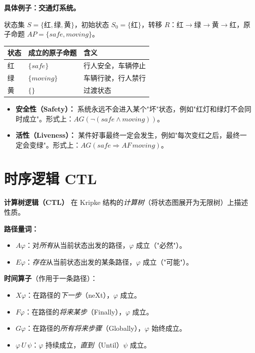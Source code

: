 \documentclass[UTF8,openany,12pt]{ctexbook}
\theoremstyle{remark}
\begin{document}
\textbf{具体例子：交通灯系统。}

状态集 $S = \{\text{红}, \text{绿}, \text{黄}\}$，初始状态 $S_0 = \{\text{红}\}$，转移 $R$：红$\to$绿$\to$黄$\to$红，原子命题 $AP = \{\mathit{safe}, \mathit{moving}\}$。

\begin{center}
\begin{tabular}{@{}lll@{}}
\toprule
状态 & 成立的原子命题 & 含义 \\
\midrule
红 & $\{\mathit{safe}\}$       & 行人安全，车辆停止 \\
绿 & $\{\mathit{moving}\}$     & 车辆行驶，行人禁行 \\
黄 & $\{\}$                    & 过渡状态 \\
\bottomrule
\end{tabular}
\end{center}

\begin{itemize}
  \item \textbf{安全性（Safety）：} 系统永远不会进入某个"坏"状态，例如"红灯和绿灯不会同时成立"。形式上：$AG(\neg(\mathit{safe} \wedge \mathit{moving}))$。
  \item \textbf{活性（Liveness）：} 某件好事最终一定会发生，例如"每次变红之后，最终一定会变绿"。形式上：$AG(\mathit{safe} \Rightarrow AF\, \mathit{moving})$。
\end{itemize}

\section{时序逻辑 CTL}

\textbf{计算树逻辑（CTL）} 在 Kripke 结构的\emph{计算树}（将状态图展开为无限树）上描述性质。

\textbf{路径量词：}
\begin{itemize}
  \item $A\varphi$：对\emph{所有}从当前状态出发的路径，$\varphi$ 成立（"必然"）。
  \item $E\varphi$：\emph{存在}从当前状态出发的某条路径，$\varphi$ 成立（"可能"）。
\end{itemize}

\textbf{时间算子}（作用于一条路径）：
\begin{itemize}
  \item $X\varphi$：在路径的\emph{下一步}（neXt），$\varphi$ 成立。
  \item $F\varphi$：在路径的\emph{将来某步}（Finally），$\varphi$ 成立。
  \item $G\varphi$：在路径的\emph{所有将来步骤}（Globally），$\varphi$ 始终成立。
  \item $\varphi\, U\, \psi$：$\varphi$ 持续成立，\emph{直到}（Until）$\psi$ 成立。
\end{itemize}
\end{document}
